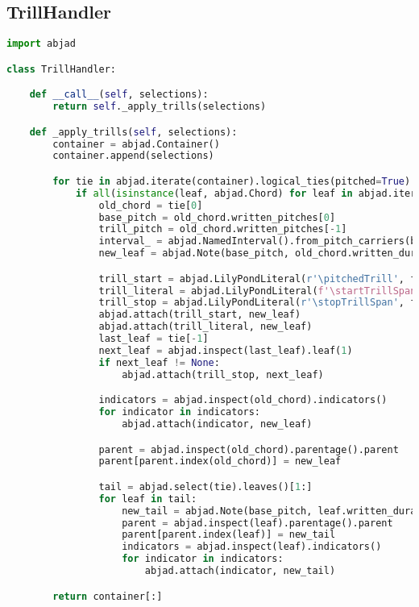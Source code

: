 \subsection{TrillHandler}
\singlespace
\begin{lstlisting}[language=Python, caption=TrillHandler]
import abjad

class TrillHandler:

    def __call__(self, selections):
        return self._apply_trills(selections)

    def _apply_trills(self, selections):
        container = abjad.Container()
        container.append(selections)

        for tie in abjad.iterate(container).logical_ties(pitched=True):
            if all(isinstance(leaf, abjad.Chord) for leaf in abjad.iterate(tie).leaves()):
                old_chord = tie[0]
                base_pitch = old_chord.written_pitches[0]
                trill_pitch = old_chord.written_pitches[-1]
                interval_ = abjad.NamedInterval().from_pitch_carriers(base_pitch, trill_pitch)
                new_leaf = abjad.Note(base_pitch, old_chord.written_duration)

                trill_start = abjad.LilyPondLiteral(r'\pitchedTrill', format_slot='before')
                trill_literal = abjad.LilyPondLiteral(f'\startTrillSpan {trill_pitch}', format_slot='after')
                trill_stop = abjad.LilyPondLiteral(r'\stopTrillSpan', format_slot='after')
                abjad.attach(trill_start, new_leaf)
                abjad.attach(trill_literal, new_leaf)
                last_leaf = tie[-1]
                next_leaf = abjad.inspect(last_leaf).leaf(1)
                if next_leaf != None:
                    abjad.attach(trill_stop, next_leaf)

                indicators = abjad.inspect(old_chord).indicators()
                for indicator in indicators:
                    abjad.attach(indicator, new_leaf)

                parent = abjad.inspect(old_chord).parentage().parent
                parent[parent.index(old_chord)] = new_leaf

                tail = abjad.select(tie).leaves()[1:]
                for leaf in tail:
                    new_tail = abjad.Note(base_pitch, leaf.written_duration)
                    parent = abjad.inspect(leaf).parentage().parent
                    parent[parent.index(leaf)] = new_tail
                    indicators = abjad.inspect(leaf).indicators()
                    for indicator in indicators:
                        abjad.attach(indicator, new_tail)

        return container[:]
\end{lstlisting}
\doublespace


